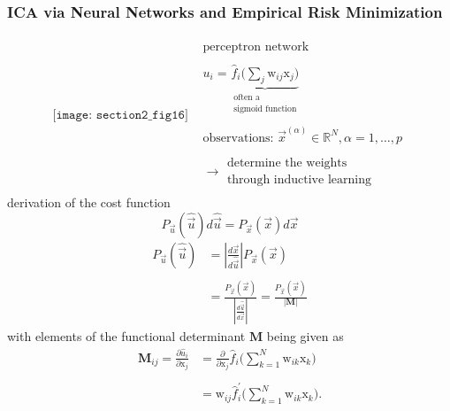 
\subsubsection{ICA via Neural Networks and Empirical Risk Minimization}
\[ \begin{array}{ll}
	\texttt{[image: section2\_fig16]}
	& \begin{array}{l}
		\text{perceptron network} \\\\
		u_i = \underbrace{ \widehat{f}_i 
				\Big( \sum\limits_j \mathrm{w}_{ij} 
					\mathrm{x}_j \Big) }_{
					\substack{ \text{often a} \\
						   \text{sigmoid function}} }
				\\\\
		\text{observations: } \vec{x}^{(\alpha)} \in \mathbb{R}^N, 
			\alpha = 1, \ldots, p \\\\
		\rightarrow \substack{	\text{determine the weights} \\
					\text{through inductive learning}}
	\end{array}
\end{array} \]
derivation of the cost function
\begin{equation}
	P_{\vec{u}} (\widehat{\vec{u}}) d \widehat{\vec{u}}
		= P_{\vec{x}}(\vec{x}) d \vec{x}
\end{equation}
\begin{equation}
	\begin{array}{ll}
	P_{\vec{u}} (\widehat{\vec{u}}) 
	& = \left| \frac{d \vec{x}}{d \widehat{\vec{u}}} \right|
		P_{\vec{x}}(\vec{x}) \\\\
	& = \frac{P_{\vec{x}}(\vec{x})}{ \left| 
		\frac{d \widehat{\vec{u}}}{d \vec{x}} \right|}
       = \frac{P_{\vec{x}}(\vec{x})}{|\mathbf{M}|}
	\end{array}
\end{equation}
with elements of the functional determinant $\mathbf{M}$ being given as
\begin{equation}
	\begin{array}{ll}
 \mathbf{M}_{ij}=	\frac{\partial \widehat{u}_i}{\partial \mathrm{x}_j}
	& = \frac{\partial}{\partial \mathrm{x}_j} 
		\widehat{f}_i \bigg( \sum\limits_{k = 1}^N \mathrm{w}_{ik} 
		\mathrm{x}_k \bigg) \\\\
	& = \mathrm{w}_{ij} \widehat{f}_i^{'} \bigg( \sum\limits_{k = 1}^N 
		\mathrm{w}_{ik} \mathrm{x}_k \bigg).
	\end{array}
\end{equation}
